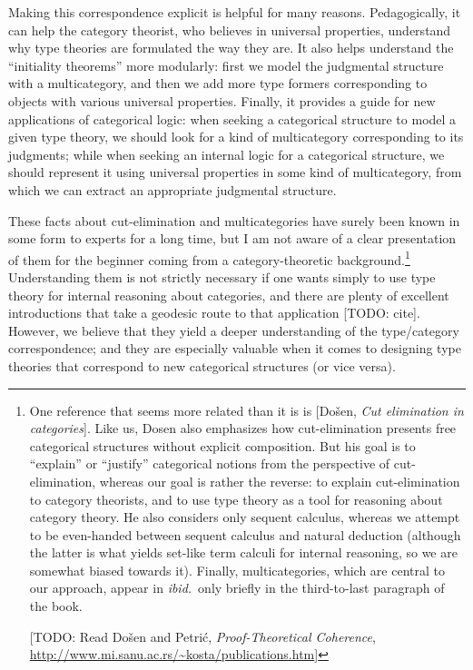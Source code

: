 \documentclass{book}
\begin{document}
Making this correspondence explicit is helpful for many reasons.
Pedagogically, it can help the category theorist, who believes in universal properties, understand why type theories are formulated the way they are.
It also helps understand the ``initiality theorems'' more modularly: first we model the judgmental structure with a multicategory, and then we add more type formers corresponding to objects with various universal properties.
Finally, it provides a guide for new applications of categorical logic: when seeking a categorical structure to model a given type theory, we should look for a kind of multicategory corresponding to its judgments; while when seeking an internal logic for a categorical structure, we should represent it using universal properties in some kind of multicategory, from which we can extract an appropriate judgmental structure.

These facts about cut-elimination and multicategories have surely been known in some form to experts for a long time, but I am not aware of a clear presentation of them for the beginner coming from a category-theoretic background.\footnote{One reference that seems more related than it is is [Do\v{s}en, \textit{Cut elimination in categories}].
  Like us, Dosen also emphasizes how cut-elimination presents free categorical structures without explicit composition.
  But his goal is to ``explain'' or ``justify'' categorical notions from the perspective of cut-elimination, whereas our goal is rather the reverse: to explain cut-elimination to category theorists, and to use type theory as a tool for reasoning about category theory.
  He also considers only sequent calculus, whereas we attempt to be even-handed between sequent calculus and natural deduction (although the latter is what yields set-like term calculi for internal reasoning, so we are somewhat biased towards it).
  Finally, multicategories, which are central to our approach, appear in \textit{ibid.}\ only briefly in the third-to-last paragraph of the book.

  [TODO: Read Do\v{s}en and Petri\'{c}, \textit{Proof-Theoretical Coherence}, \url{http://www.mi.sanu.ac.rs/~kosta/publications.htm}]}
Understanding them is not strictly necessary if one wants simply to use type theory for internal reasoning about categories, and there are plenty of excellent introductions that take a geodesic route to that application [TODO: cite].
However, we believe that they yield a deeper understanding of the type/category correspondence; and they are especially valuable when it comes to designing type theories that correspond to new categorical structures (or vice versa).
\end{document}
